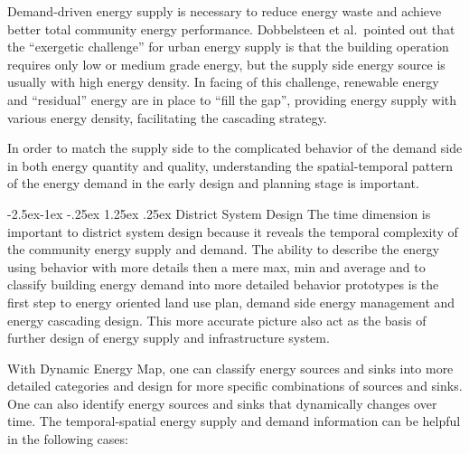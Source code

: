 \documentclass[hidelinks,12pt]{article}
\makeatletter
\renewcommand\paragraph{\@startsection{paragraph}{4}{\z@}%
            {-2.5ex\@plus -1ex \@minus -.25ex}%
            {1.25ex \@plus .25ex}%
            {\normalfont\normalsize\bfseries}}
\makeatother
\begin{document}
Demand-driven energy supply is necessary to reduce energy waste and
achieve better total community energy performance. Dobbelsteen et al.\
pointed out that the ``exergetic challenge'' for urban energy supply
is that the building operation requires only low or medium grade
energy, but the supply side energy source is usually with high energy
density. In facing of this challenge, renewable energy and
``residual'' energy are in place to ``fill the gap'', providing energy
supply with various energy density, facilitating the cascading
strategy\cite{Dobbelsteen2013}.

In order to match the supply side to the complicated behavior of the
demand side in both energy quantity and quality, understanding the
spatial-temporal pattern of the energy demand in the early design and
planning stage is important.

\paragraph{District System Design}\label{districtDesign}
The time dimension is important to district system design because it
reveals the temporal complexity of the community energy supply and
demand. The ability to describe the energy using behavior with more
details then a mere max, min and average and to classify building
energy demand into more detailed behavior prototypes is the first step
to energy oriented land use plan, demand side energy management and
energy cascading design. This more accurate picture also act as the
basis of further design of energy supply and infrastructure system.

With Dynamic Energy Map, one can classify energy sources and sinks
into more detailed categories and design for more specific
combinations of sources and sinks. One can also identify energy
sources and sinks that dynamically changes over time. The
temporal-spatial energy supply and demand information can be helpful
in the following cases:
\end{document}
